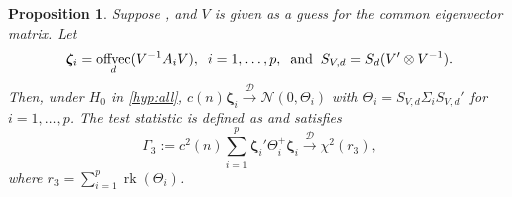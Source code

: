 \documentclass[12pt]{article}
\numberwithin{thm}{section}
\numberwithin{defn}{section}
\numberwithin{lem}{section}
\newtheorem{prop}{Proposition}
\numberwithin{prop}{section}
\numberwithin{cor}{section}
\numberwithin{rem}{section}
\DeclareMathOperator{\offvec}{offvec}
\newcommand{\rank}{\operatorname{rk}}
\begin{document}
\begin{prop}\label{thm:multi_eig}
Suppose , and $V$ is given as a guess for the common eigenvector matrix. Let 
\begin{equation} \label{eq:xii}
\bm{\zeta}_i = \offvec_d(V^{-1} A_i V), \hspace{0.2cm} i = 1, \dots, p, 
\hspace{0.2cm}\text{and}\hspace{0.2cm} 
S_{V,d} = S_d (V' \otimes V^{-1}). 
\end{equation}
Then, under $H_0$ in \eqref{hyp:all},
$
    c(n) \bm{\zeta}_i \xrightarrow{\mathcal{D}} \mathcal{N}(0, \Theta_i)
$
with $\Theta_i = S_{V,d} \Sigma_i S_{V,d}'$ for $i = 1, \dots, p$.
The test statistic is defined as and satisfies
\begin{equation}\label{eqn:multi_wald}
    \Gamma_3 := c^2(n) \sum_{i = 1}^p \bm{\zeta}_i' \Theta_i^+ \bm{\zeta}_i \xrightarrow{\mathcal{D}} \chi^2(r_3),
\end{equation}
where $r_3 = \sum_{i=1}^p \rank(\Theta_i)$.
\end{prop}
\end{document}
